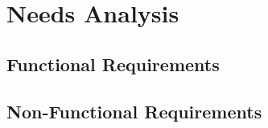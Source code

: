 \section{Needs Analysis}
\subsection{Functional Requirements}


\subsection{Non-Functional Requirements}